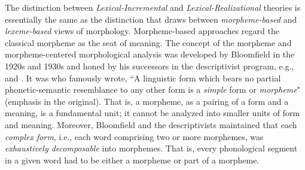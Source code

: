 The distinction between \emph{Lexical-Incremental} 
and \emph{Lexical-Realizational} 
theories is essentially the same as the distinction 
that \cite{aronoff:1994} draws
between \emph{morpheme-based} and \emph{lexeme-based} 
views of morphology. Morpheme-based approaches regard 
the classical morpheme as the seat of meaning. %
The concept of the morpheme and morpheme-centered morphological analysis
was developed by Bloomfield in the 1920s and 1930s 
\citep{bloomfield:1926, bloomfield:1933} and honed by his 
successors in the descriptivist program, e.g., %
\cite{hockett:1947} and \cite{harris:1955}.
It was \cite[][p. 161]{bloomfield:1933} who famously wrote, ``A linguistic form 
which bears no partial phonetic-semantic resemblance to any other form is a \emph{simple} form or \emph{morpheme}" (emphasis in the original). 
That is, a morpheme, as a pairing of a form and a meaning, is a fundamental unit; it cannot be analyzed into smaller units
of form and meaning.
Moreover, Bloomfield and the descriptivists maintained that
each \emph{complex form}, i.e., each word comprising 
two or more morphemes, was \emph{exhaustively decomposable} 
into morphemes. That is, every phonological segment
in a given word had to be either a morpheme or part of a morpheme. 



